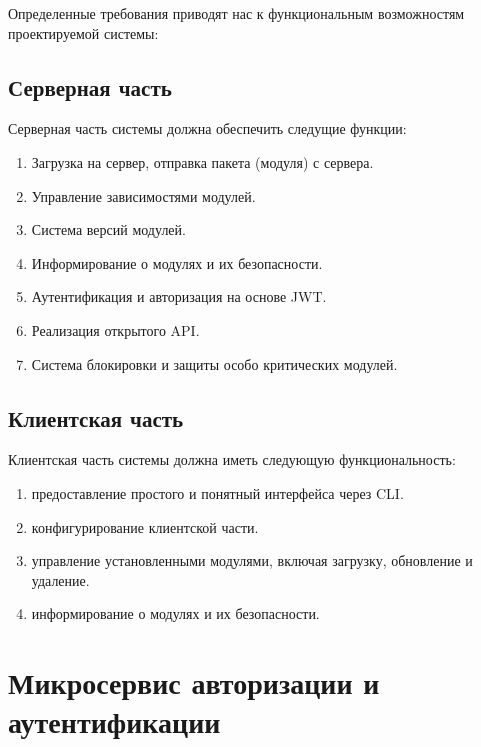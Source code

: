 Определенные требования приводят нас к функциональным возможностям проектируемой системы:

\subsection{Серверная часть}

Серверная часть системы должна обеспечить следущие функции:

\begin{enumerate}
    \item Загрузка на сервер, отправка пакета (модуля) с сервера.
    \item Управление зависимостями модулей.
    \item Система версий модулей.
    \item Информирование о модулях и их безопасности.
    \item Аутентификация и авторизация на основе JWT.
    \item Реализация открытого API.
    \item Система блокировки и защиты особо критических модулей.
\end{enumerate}


\subsection{Клиентская часть}

Клиентская часть системы должна иметь следующую функциональность:

\begin{enumerate}
    \item предоставление простого и понятный интерфейса через CLI.
    \item конфигурирование клиентской части.
    \item управление установленными модулями, включая загрузку, обновление и удаление.
    \item информирование о модулях и их безопасности.
\end{enumerate}

\section{Микросервис авторизации и аутентификации}

